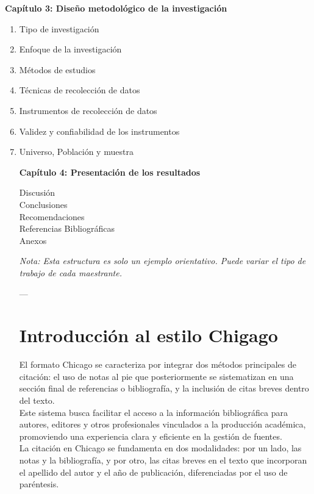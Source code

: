 \documentclass[12pt,a4paper]{article}
\begin{document}
\noindent\textbf{Capítulo 3: Diseño metodológico de la investigación}
\begin{enumerate}[resume]
  \item Tipo de investigación
  \item Enfoque de la investigación
  \item Métodos de estudios
  \item Técnicas de recolección de datos
  \item Instrumentos de recolección de datos
    \item Validez y confiabilidad de los instrumentos
    \item Universo, Población y muestra

\noindent\textbf{Capítulo 4: Presentación de los resultados}
\begin{enumerate}[resume]
 Discusión \\
  Conclusiones\\
  Recomendaciones\\
  Referencias Bibliográficas\\
  Anexos
\end{enumerate}

\vspace{0.5cm}
\textit{Nota: Esta estructura es solo un ejemplo orientativo. Puede variar el tipo de trabajo de cada maestrante.}

---

\section{Introducción al estilo Chigago}
El formato Chicago se caracteriza por integrar dos métodos principales de citación: el uso de notas al pie que posteriormente se sistematizan en una sección final de referencias o bibliografía, y la inclusión de citas breves dentro del texto.\\

Este sistema busca facilitar el acceso a la información bibliográfica para autores, editores y otros profesionales vinculados a la producción académica, promoviendo una experiencia clara y eficiente en la gestión de fuentes.\\

La citación en Chicago se fundamenta en dos modalidades: por un lado, las notas y la bibliografía, y por otro, las citas breves en el texto que incorporan el apellido del autor y el año de publicación, diferenciadas por el uso de paréntesis.\\


\end{enumerate}
\end{document}
